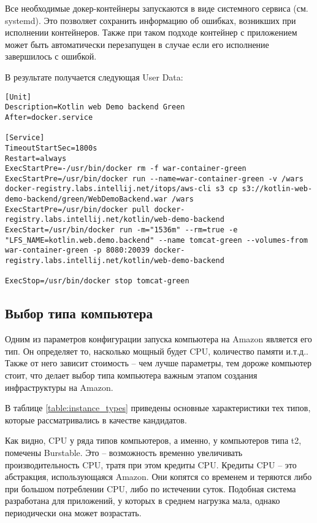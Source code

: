 	Все необходимые докер-контейнеры запускаются в виде системного сервиса (см. systemd). Это позволяет сохранить информацию об ошибках, возникших при исполнении контейнеров. Также при таком подходе контейнер с приложением может быть автоматически перезапущен в случае если его исполнение завершилось с ошибкой.
	
	В результате получается следующая User Data:
\begin{lstlisting}
[Unit]
Description=Kotlin web Demo backend Green
After=docker.service

[Service]
TimeoutStartSec=1800s
Restart=always
ExecStartPre=-/usr/bin/docker rm -f war-container-green
ExecStartPre=/usr/bin/docker run --name=war-container-green -v /wars docker-registry.labs.intellij.net/itops/aws-cli s3 cp s3://kotlin-web-demo-backend/green/WebDemoBackend.war /wars
ExecStartPre=/usr/bin/docker pull docker-registry.labs.intellij.net/kotlin/web-demo-backend
ExecStart=/usr/bin/docker run -m="1536m" --rm=true -e "LFS_NAME=kotlin.web.demo.backend" --name tomcat-green --volumes-from war-container-green -p 8080:20039 docker-registry.labs.intellij.net/kotlin/web-demo-backend

ExecStop=/usr/bin/docker stop tomcat-green
\end{lstlisting}

\subsection{Выбор типа компьютера}
	Одним из параметров конфигурации запуска компьютера на Amazon является его тип. Он определяет то, насколько мощный будет CPU, количество памяти и.т.д.. Также от него зависит стоимость -- чем лучше параметры, тем дороже компьютер стоит, что делает выбор типа компьютера важным этапом создания инфраструктуры на Amazon.
	
	В таблице \ref{table:instance_types} приведены основные характеристики тех типов, которые рассматривались в качестве кандидатов.
	
	Как видно, CPU у ряда типов компьютеров, а именно, у компьютеров типа t2, помечены Burstable. Это -- возможность временно увеличивать производительность CPU, тратя при этом кредиты CPU. Кредиты CPU -- это абстракция, использующаяся Amazon. Они копятся со временем и теряются либо при большом потреблении CPU, либо по истечении суток. Подобная система разработана для приложений, у которых в среднем нагрузка мала, однако периодически она может возрастать.
	
